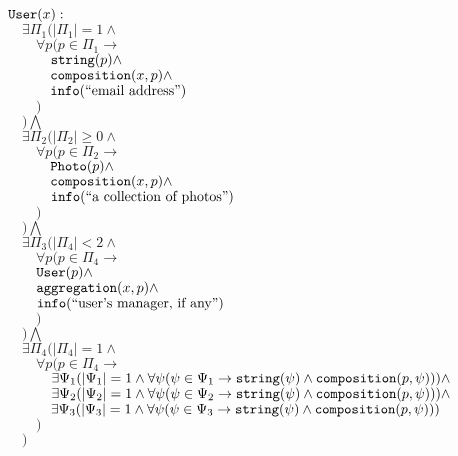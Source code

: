 \documentclass{article}
\begin{document}
    \begin{maths}
    $\mbox{\texttt{User}}(x) :$ \\
    $\quad \exists \Pi_1 (|\Pi_1| = 1 \wedge$ \\
    $\quad\quad \forall p(p \in \Pi_1 \to $ \\
    $\quad\quad\quad \mbox{\texttt{string}}(p) \wedge$ \\
    $\quad\quad\quad \mbox{\texttt{composition}}(x, p) \wedge$ \\
    $\quad\quad\quad \mbox{\texttt{info}}(\mbox{``email address''})$ \\
    $\quad\quad ) $ \\
    $\quad ) \bigwedge $ \\
    $\quad \exists \Pi_2 (|\Pi_2| \geq 0 \wedge$ \\
    $\quad\quad \forall p(p \in \Pi_2 \to $ \\
    $\quad\quad\quad \mbox{\texttt{Photo}}(p) \wedge$ \\
    $\quad\quad\quad \mbox{\texttt{composition}}(x, p) \wedge$ \\
    $\quad\quad\quad \mbox{\texttt{info}}(\mbox{``a collection of photos''})$ \\
    $\quad\quad ) $ \\
    $\quad ) \bigwedge $ \\
    $\quad \exists \Pi_3 (|\Pi_4| < 2 \wedge $ \\
    $\quad\quad \forall p(p \in \Pi_4 \to $ \\
    $\quad\quad \mbox{\texttt{User}}(p) \wedge$ \\
    $\quad\quad \mbox{\texttt{aggregation}}(x, p) \wedge$ \\
    $\quad\quad \mbox{\texttt{info}}(\mbox{``user's manager, if any''})$ \\
    $\quad\quad ) $ \\
    $\quad ) \bigwedge $ \\
    $\quad \exists \Pi_4 (|\Pi_4| = 1 \wedge$ \\
    $\quad\quad \forall p(p \in \Pi_4 \to$ \\
    $\quad\quad\quad \exists \Psi_1(|\Psi_1|=1 \wedge \forall \psi(\psi \in \Psi_1 \to \mbox{\texttt{string}}(\psi) \wedge \mbox{\texttt{composition}}(p, \psi))) \wedge$ \\
    $\quad\quad\quad \exists \Psi_2(|\Psi_2|=1 \wedge \forall \psi(\psi \in \Psi_2 \to \mbox{\texttt{string}}(\psi) \wedge \mbox{\texttt{composition}}(p, \psi))) \wedge$ \\
    $\quad\quad\quad \exists \Psi_3(|\Psi_3|=1 \wedge \forall \psi(\psi \in \Psi_3 \to \mbox{\texttt{string}}(\psi) \wedge \mbox{\texttt{composition}}(p, \psi)))$ \\
    $\quad\quad ) $ \\
    $\quad )$ \\
    \end{maths}
    
\end{document}
